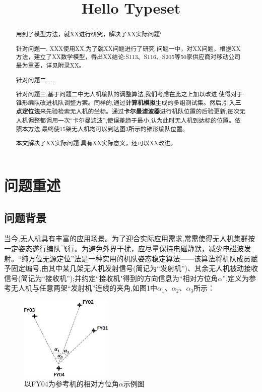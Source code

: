 \documentclass[withoutpreface,bwprint]{cumcmthesis}
\title{Hello Typeset}
\begin{document}
	\maketitle
	\begin{abstract}
		用到了模型方法，就XX进行研究，解决了XX实际问题`
		
		针对问题一, XXX使用XX,为了就XX问题进行了研究 问题一中，对XX问题，根据XX方法，建立了XX数学模型，得出XX结论:S113、S116、S205等50家供应商对移动公司最为重要，详见附录XX。
		
		针对问题二.....
		
		针对问题三,基于问题二中无人机编队的调整算法,我们考虑在此之上加以改进,使得对于锥形编队改进机队调整方案。同样的,通过\textbf{计算机模拟}生成的多组测试集。然后,引入\textbf{三点定位法}来先验检索无人机的坐标。通过\textbf{卡尔曼滤波器}进行机队位置的后验更新,每次无人机调整都调用一次“卡尔曼滤波”,使误差趋于最小,认为此时无人机到达标的位置。依照本方法,最终使15架无人机均可以到达图3所示的锥形编队位置。
		
		本文解决了XX实际问题,具有XX实际意义，还可以XX改进。
		
	\end{abstract}
		\section{问题重述}
	\subsection{问题背景}
	
	
	当今,无人机具有丰富的应用场景。为了迎合实际应用需求,常需使得无人机集群按一定姿态遂行编队飞行。为避免外界干扰，应尽量保持电磁静默，减少电磁波发射。“纯方位无源定位”法是一种实用的机队姿态稳定算法——该算法将机队成员赋予固定编号,由其中某几架无人机发射信号(简记为“发射机”)、其余无人机被动接收信号(简记为“接收机”);并约定“接收机"得到的方向信息为“相对方位角$\alpha$”,定义为参考无人机与任意两架“发射机”连线的夹角,如图1中$\alpha_{1}$、$\alpha_{2}$、$\alpha_{3}$所示：
	
	\begin{figure}[htbp!]
		\centering
		\includegraphics[height=4cm]{./figures/1-1.png}
		\caption{以FY04为参考机的相对方位角$\alpha$示例图}
		\label{fig:1}
	\end{figure}
	
\end{document}
